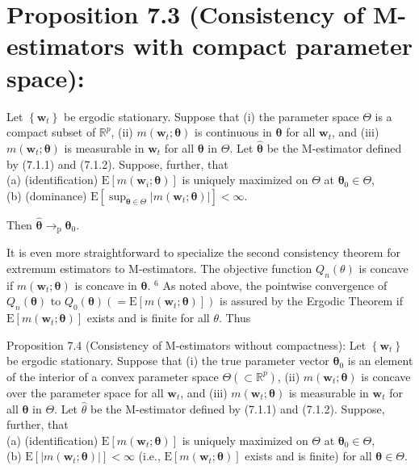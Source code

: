 \documentclass[10pt]{article}
\begin{document}
\section*{Proposition 7.3 (Consistency of M-estimators with compact parameter space):}
Let $\left\{\mathbf{w}_{t}\right\}$ be ergodic stationary. Suppose that (i) the parameter space $\Theta$ is a compact subset of $\mathbb{R}^{p}$, (ii) $m\left(\mathbf{w}_{t} ; \boldsymbol{\theta}\right)$ is continuous in $\boldsymbol{\theta}$ for all $\mathbf{w}_{t}$, and (iii) $m\left(\mathbf{w}_{t} ; \boldsymbol{\theta}\right)$ is measurable in $\mathbf{w}_{t}$ for all $\boldsymbol{\theta}$ in $\Theta$. Let $\hat{\boldsymbol{\theta}}$ be the M-estimator defined by (7.1.1) and (7.1.2). Suppose, further, that\\
(a) (identification) $\mathrm{E}\left[m\left(\mathbf{w}_{i} ; \boldsymbol{\theta}\right)\right]$ is uniquely maximized on $\Theta$ at $\boldsymbol{\theta}_{0} \in \Theta$,\\
(b) (dominance) $\mathrm{E}\left[\sup _{\boldsymbol{\theta} \in \Theta}\left|m\left(\mathbf{w}_{t} ; \boldsymbol{\theta}\right)\right|\right]<\infty$.

Then $\hat{\boldsymbol{\theta}} \rightarrow_{\mathrm{p}} \boldsymbol{\theta}_{0}$.

It is even more straightforward to specialize the second consistency theorem for extremum estimators to M-estimators. The objective function $Q_{n}(\theta)$ is concave if $m\left(\mathbf{w}_{t} ; \boldsymbol{\theta}\right)$ is concave in $\boldsymbol{\theta}$. ${ }^{6}$ As noted above, the pointwise convergence of $Q_{n}(\boldsymbol{\theta})$ to $Q_{0}(\boldsymbol{\theta})\left(=\mathrm{E}\left[m\left(\mathbf{w}_{t} ; \boldsymbol{\theta}\right)\right]\right)$ is assured by the Ergodic Theorem if $\mathrm{E}\left[m\left(\mathbf{w}_{t} ; \boldsymbol{\theta}\right)\right]$ exists and is finite for all $\theta$. Thus

Proposition 7.4 (Consistency of M-estimators without compactness): Let $\left\{\mathbf{w}_{t}\right\}$ be ergodic stationary. Suppose that (i) the true parameter vector $\boldsymbol{\theta}_{0}$ is an element of the interior of a convex parameter space $\Theta\left(\subset \mathbb{R}^{p}\right)$, (ii) $m\left(\mathbf{w}_{t} ; \boldsymbol{\theta}\right)$ is concave over the parameter space for all $\mathbf{w}_{t}$, and (iii) $m\left(\mathbf{w}_{t} ; \boldsymbol{\theta}\right)$ is measurable in $\mathbf{w}_{t}$ for all $\boldsymbol{\theta}$ in $\Theta$. Let $\hat{\theta}$ be the M-estimator defined by (7.1.1) and (7.1.2). Suppose, further, that\\
(a) (identification) $\mathrm{E}\left[m\left(\mathbf{w}_{t} ; \boldsymbol{\theta}\right)\right]$ is uniquely maximized on $\Theta$ at $\boldsymbol{\theta}_{0} \in \Theta$,\\
(b) $\mathrm{E}\left[\left|m\left(\mathbf{w}_{t} ; \boldsymbol{\theta}\right)\right|\right]<\infty$ (i.e., $\mathrm{E}\left[m\left(\mathbf{w}_{t} ; \boldsymbol{\theta}\right)\right]$ exists and is finite) for all $\boldsymbol{\theta} \in \Theta$.
\end{document}
